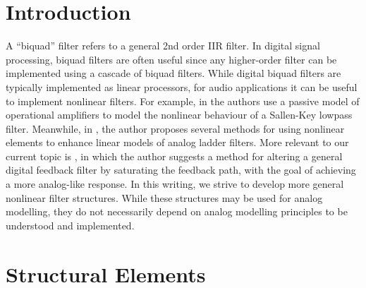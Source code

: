 \documentclass[twoside,a4paper]{article}
\title{\papertitle}
\affiliation{
\paperauthorA \, }
{\href{http://ccrma.stanford.edu}{Center for Computer Research in Music and Acoustics} \\ Stanford University \\ Palo Alto, CA \\ {\tt \href{mailto:jatin@ccrma.stanford.edu}{jatin@ccrma.stanford.edu}}}
\newif\ifpdf
\begin{document}
\ifpdf %
  \DeclareGraphicsExtensions{.png,.jpg,.pdf}
\else  %
\fi

\maketitle

\begin{abstract}
Biquad filters are a common tool for filter design. In this
writing, we develop two structures for creating biquad filters
with nonlinear elements. We provide conditions for the guaranteed
stability of the nonlinear filters, and derive expressions for
instantaneous pole analysis. Finally, we examine example filters
built with these nonlinear structures, and show how the first
nonlinear structure can be used in the context of analog modelling.
\end{abstract}

\section{Introduction}
A ``biquad'' filter refers to a general 2nd order IIR filter.
In digital signal processing, biquad filters are often useful
since any higher-order filter can be implemented using a cascade
of biquad filters. While digital biquad filters are typically implemented
as linear processors, for audio applications it can be useful to
implement nonlinear filters. For example, in \cite{SKF} the authors
use a passive model of operational amplifiers to model the nonlinear
behaviour of a Sallen-Key lowpass filter. Meanwhile, in \cite{Vadim},
the author proposes several methods for using nonlinear elements
to enhance linear models of analog ladder filters. More relevant to
our current topic is \cite{Rossum1992MakingDF}, in which the author
suggests a method for altering a general digital feedback filter
by saturating the feedback path, with the goal of achieving a more
analog-like response. In this writing, we strive
to develop more general nonlinear filter structures. While these structures
may be used for analog modelling, they do not necessarily depend on analog
modelling principles to be understood and implemented.

\section{Structural Elements}
\end{document}
